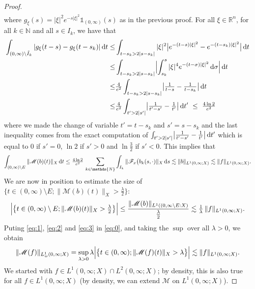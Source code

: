 \documentclass[a4paper, 12pt]{article}
\theoremstyle{plain}
\theoremstyle{definition}
\theoremstyle{remark}
\numberwithin{equation}{section}
\begin{document}
\begin{proof}
\begin{align*}
\end{align*}
%
where $g_{\xi}(s)=|\xi|^2e^{-s|\xi|^2}{\mathds{1}}_{(0,\infty)}(s)$ as in the previous proof.
For all $\xi\in{\mathds{R}}^n$, for all $k\in {\mathds{N}}$ and all $s\in I_k$, we have that
%
\begin{align*}
\int_{(0,\infty)\setminus \tilde{I}_k}|g_{\xi}(t-s)-g_{\xi}(t-s_k)|\,{\rm d}t
\le& 
\int_{t-s_k>2|s-s_k|}|\xi|^2\bigl|e^{-(t-s)|\xi|^2}-e^{-(t-s_k)|\xi|^2}\bigr| \,{\rm d}t \\
\le&
\int_{t-s_k>2|s-s_k|} \Bigl|\int_{s_k}^s|\xi|^4 e^{-(t-\sigma)|\xi|^2}\,{\rm d}\sigma\Bigr|\,{\rm d}t\\
\le&
\tfrac{4}{e^2}\int_{t-s_k>2|s-s_k|} \bigl|\tfrac{1}{t-s}-\tfrac{1}{t-s_k}\bigr| \,{\rm d}t\\
\le&
\tfrac{4}{e^2}\int_{t'>2|s'|} \bigl|\tfrac{1}{t'-s'}-\tfrac{1}{t'}\bigr| \,{\rm d}t' \ \le \ \tfrac{4\ln 2}{e^2}
\end{align*}
%
where we made the change of variable $t'=t-s_k$ and $s'=s-s_k$ and the last inequality comes from the exact computation of
$\int_{t'>2|s'|} \bigl|\tfrac{1}{t'-s'}-\tfrac{1}{t'}\bigr| \,{\rm d}t'$ which is equal to $0$ if $s'=0$, $\ln 2$ if $s'>0$ and $\ln\frac{3}{2}$ if $s'<0$.
This implies that
\[
\int_{(0,\infty)\setminus E}\|{\mathscr{M}}(b)(t)\|_X\, {\rm d}t
\le \tfrac{4\ln 2}{e^2}\,\sum_{k\in{\mathds{N}}}\int_{I_k}\|{\mathscr{F}}_x\bigl(b_k(s,\cdot)\|_X\,{\rm d}s
\lesssim \|b\|_{L^1(0,\infty;X)}\lesssim \|f\|_{L^1(0,\infty;X)}.
\]
We are now in position to estimate the size of $\bigl\{t\in (0,\infty)\setminus E; \|{\mathscr{M}}(b)(t)\|_X> \tfrac{\lambda}{2}\bigr\}$:
%
\begin{equation}
\label{eq:3}
\Bigl|\bigl\{t\in (0,\infty)\setminus E; \|{\mathscr{M}}(b)(t)\|_X> \tfrac{\lambda}{2}\bigr\}\Bigr|\le
\frac{\|{\mathscr{M}}(b)\|_{L^1((0,\infty\setminus E:X)}}{\frac{\lambda}{2}}\lesssim\tfrac{1}{\lambda}\,\|f\|_{L^1(0,\infty;X)}.
\end{equation}
%
Puting \eqref{eq:1}, \eqref{eq:2} and \eqref{eq:3} in \eqref{eq:0}, and taking the $\sup$ over all $\lambda>0$, we obtain
\[
\|{\mathscr{M}}(f)\|_{L^1_w(0,\infty;X)}
=\sup_{\lambda>0}\lambda \Bigl|\bigl\{t\in (0,\infty); \|{\mathscr{M}}(f)(t)\|_X> \lambda\bigr\}\Bigr|
\lesssim \|f\|_{L^1(0,\infty;X)}.
\]
We started with $f\in L^1(0,\infty;X)\cap L^2(0,\infty;X)$; by density, this is also true for all $f\in L^1(0,\infty;X)$ (by density, we can
extend ${\mathscr{M}}$ on $L^1(0,\infty;X)$).


\end{proof}
\end{document}
